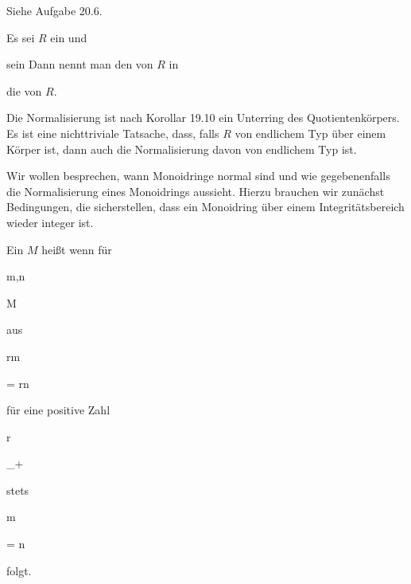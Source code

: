 { Siehe Aufgabe 20.6. }



{}

{


Es sei $R$ ein
und

 sein
Dann nennt man den
von $R$ in

 die  von $R$.


}


Die Normalisierung ist nach
Korollar 19.10
ein Unterring des Quotientenkör\-pers. Es ist eine nichttriviale Tatsache, dass, falls $R$ von endlichem Typ über einem Körper ist, dann auch die Normalisierung davon von endlichem Typ ist.




Wir wollen besprechen, wann Monoidringe normal sind und wie gegebenenfalls die Normalisierung eines Monoidrings aussieht. Hierzu brauchen wir zunächst Bedingungen, die sicherstellen, dass ein Monoidring über einem Integritätsbereich wieder integer ist.



{}

{


Ein
$M$ heißt  wenn für


\mavergleichskette

{\vergleichskette

{ m,n
}

{ \in }{ M
}

{  }{
}

{    }{
}

{   }{
}

}
{}{}{}
aus


\mavergleichskette

{\vergleichskette

{rm
}

{ = }{ rn
}

{  }{
}

{    }{
}

{   }{
}

}
{}{}{}
für eine positive Zahl


\mavergleichskette

{\vergleichskette

{ r
}

{ \in }{ \N_+
}

{  }{
}

{    }{
}

{   }{
}

}
{}{}{}
stets


\mavergleichskette

{\vergleichskette

{m
}

{ = }{ n
}

{  }{
}

{    }{
}

{   }{
}

}
{}{}{}
folgt.


}


